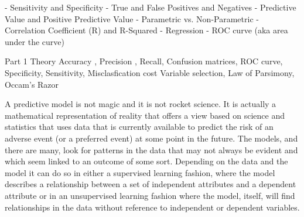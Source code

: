 - Sensitivity and Specificity
- True and False Positives and Negatives
- Predictive Value and Positive Predictive Value
- Parametric vs. Non-Parametric
- Correlation Coefficient (R) and R-Squared
- Regression
- ROC curve (aka area under the curve)

Part 1 Theory 
Accuracy , Precision , Recall, Confusion matrices, ROC curve, Specificity, Sensitivity, Misclasfication cost
Variable selection, Law of Parsimony, Occam's Razor

























A predictive model is not magic and it is not rocket science. It is actually a mathematical representation
of reality that offers a view based on science and statistics that uses data that is currently available to
predict the risk of an adverse event (or a preferred event) at some point in the future. The models, and
there are many, look for patterns in the data that may not always be evident and which seem linked to
an outcome of some sort. Depending on the data and the model it can do so in either a supervised
learning fashion, where the model describes a relationship between a set of independent attributes and
a dependent attribute or in an unsupervised learning fashion where the model, itself, will find
relationships in the data without reference to independent or dependent variables.


